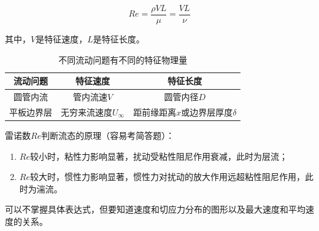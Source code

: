 \begin{equation}
	Re = \dfrac{\rho V L}{\mu} = \dfrac{V L}{\nu}
\end{equation}

其中，$V$是特征速度，$L$是特征长度。

\begin{table}[H]
	\centering
	\begin{tabular}{ccc}
		\toprule[1pt]
		流动问题 & 特征速度 & 特征长度 \\
		\hline
		圆管内流 & 管内流速$V$ & 圆管内径$D$ \\
		平板边界层 & 无穷来流速度$U_{\infty}$ & 距前缘距离$x$或边界层厚度$\delta$\\
		\bottomrule[1pt]
	\end{tabular}
    \caption{不同流动问题有不同的特征物理量}
\end{table}

雷诺数$Re$判断流态的原理（容易考简答题）：

\begin{enumerate}
	\item $Re$较小时，粘性力影响显著，扰动受粘性阻尼作用衰减，此时为层流；
	\item $Re$较大时，惯性力影响显著，惯性力对扰动的放大作用远超粘性阻尼作用，此时为湍流。
\end{enumerate}


可以不掌握具体表达式，但要知道速度和切应力分布的图形以及最大速度和平均速度的关系。

